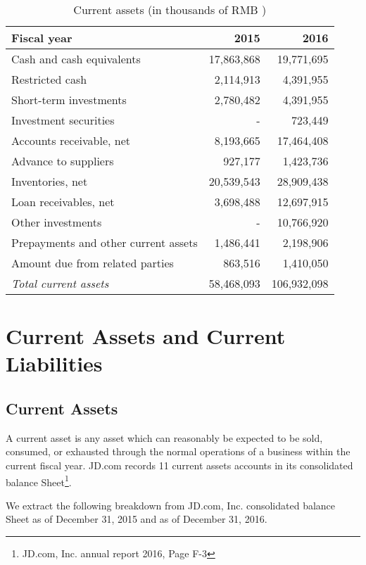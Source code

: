 \begin{table}[H]	
	\begin{center}
		\begin{tabular}{lrr}
			\toprule
			\textbf{Fiscal year}&\textbf{2015}&\textbf{2016}\\
			\midrule
			Cash and cash equivalents&17,863,868&19,771,695\\
			Restricted cash&2,114,913&4,391,955\\
			Short-term investments&2,780,482&4,391,955\\
			Investment securities&-&723,449\\
			Accounts receivable, net&8,193,665&17,464,408\\
			Advance to suppliers&927,177&1,423,736\\
			Inventories, net&20,539,543&28,909,438\\
			Loan receivables, net&3,698,488&12,697,915\\
			Other investments&-&10,766,920\\
			Prepayments and other current assets&1,486,441&2,198,906\\
			Amount due from related parties&863,516&1,410,050\\
			\qquad\emph{Total current assets}&58,468,093&106,932,098\\
			\bottomrule
		\end{tabular}
	\end{center}
	\caption{Current assets (in thousands of RMB \textyen)}\label{table:1}
\end{table}

\chapter{Current Assets and Current Liabilities}
\section{Current Assets}
A current asset is any asset which can reasonably be expected to be sold, consumed, or exhausted through the normal operations of a business within the current fiscal year. JD.com records 11 current assets accounts in its consolidated balance Sheet\footnote{JD.com, Inc. annual report 2016, Page F-3}. 

We extract the following breakdown from JD.com, Inc. consolidated balance Sheet as of December 31, 2015 and as of December 31, 2016.\\

